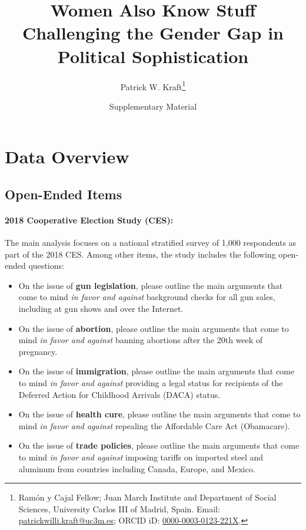 \documentclass[12pt]{article}
\author{Patrick W. Kraft\footnote{Ramón y Cajal Fellow; Juan March Institute and Department of Social Sciences, University Carlos III of Madrid, Spain. Email: \href{mailto:patrickwilli.kraft@uc3m.es}{patrickwilli.kraft@uc3m.es}; ORCID iD: \href{https://orcid.org/0000-0003-0123-221X}{0000-0003-0123-221X}.}}
\title{Women Also Know Stuff \\ \large{Challenging the Gender Gap in Political Sophistication}}
\date{Supplementary Material}
\begin{document}
\doublespacing
\maketitle
\singlespacing
\renewcommand\thesubsection{\Roman{subsection}}
\setcounter{page}{1}
\appendix
\startcontents[sections]
\thispagestyle{empty}
\clearpage
\newpage\setcounter{page}{1}



\section{Data Overview}\label{app:variables}

\subsection{Open-Ended Items}

\paragraph{2018 Cooperative Election Study (CES):}
The main analysis focuses on a national stratified survey of 1,000 respondents as part of the 2018 CES. Among other items, the study includes the following open-ended questions:
\begin{itemize}
	\item On the issue of \textbf{gun legislation}, please outline the main arguments that come to mind \textit{in favor and against} background checks for all gun sales, including at gun shows and over the Internet.
	\item On the issue of \textbf{abortion}, please outline the main arguments that come to mind \textit{in favor and against} banning abortions after the 20th week of pregnancy.
	\item On the issue of \textbf{immigration}, please outline the main arguments that come to mind \textit{in favor and against} providing a legal status for recipients of the Deferred Action for Childhood Arrivals (DACA) status.
	\item On the issue of \textbf{health cure}, please outline the main arguments that come to mind \textit{in favor and against} repealing the Affordable Care Act (Obamacare).
	\item On the issue of \textbf{trade policies}, please outline the main arguments that come to mind \textit{in favor and against} imposing tariffs on imported steel and aluminum from countries including Canada, Europe, and Mexico.
\end{itemize}
\end{document}

